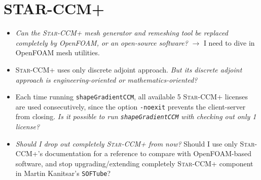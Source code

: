 \documentclass[onsided]{book}
\numberwithin{equation}{section}
\begin{document}
\section{STAR-CCM+}
\begin{itemize}
    \item \textit{Can the \textsc{Star-CCM+} mesh generator and remeshing tool be replaced completely by OpenFOAM, or an open-source software?} $\to$ I need to dive in OpenFOAM mesh utilities.
    \item \textsc{Star-CCM+} uses only discrete adjoint approach. \textit{But its discrete adjoint approach is engineering-oriented or mathematics-oriented?}
    \item Each time running \texttt{shapeGradientCCM}, all available 5 \textsc{Star-CCM+} licenses are used consecutively, since the option \texttt{-noexit} prevents the client-server from closing. \textit{Is it possible to run \texttt{shapeGradientCCM} with checking out only 1 license?}
    \item \textit{Should I drop out completely \textsc{Star-CCM+} from now?} Should I use only \textsc{Star-CCM+}'s documentation for a reference to compare with OpenFOAM-based software, and stop upgrading/extending completely \textsc{Star-CCM+} component in Martin Kanitsar's \texttt{SOFTube}?
\end{itemize}
\end{document}

